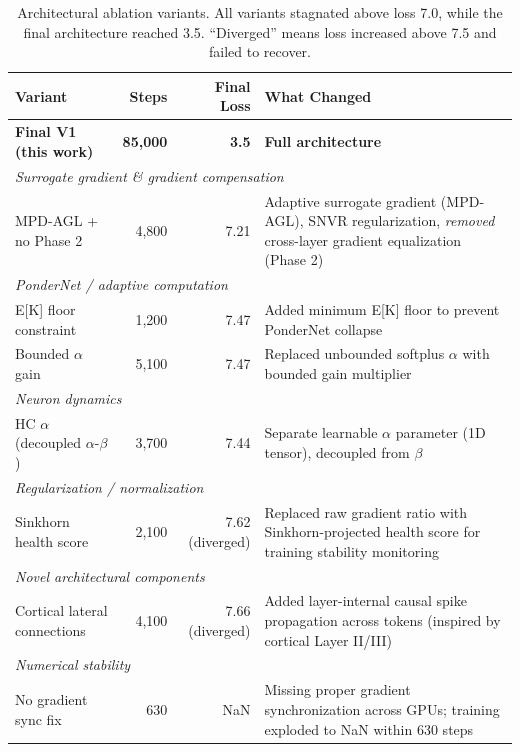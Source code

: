 \documentclass[10pt,twocolumn]{article}
\begin{document}
\begin{table}[H]
\centering
\caption{Architectural ablation variants. All variants stagnated above loss 7.0, while the final architecture reached 3.5.
``Diverged'' means loss increased above 7.5 and failed to recover.}
\label{tab:ablation}
\scriptsize
\begin{tabular}{p{1.8cm}rrp{3.5cm}}
\toprule
\textbf{Variant} & \textbf{Steps} & \textbf{Final Loss} & \textbf{What Changed} \\
\midrule
\textbf{Final V1 (this work)} & \textbf{85,000} & \textbf{3.5} & \textbf{Full architecture} \\
\midrule
\multicolumn{4}{l}{\emph{Surrogate gradient \& gradient compensation}} \\
\quad MPD-AGL + no Phase 2 & 4,800 & 7.21 & Adaptive surrogate gradient (MPD-AGL), SNVR regularization, \emph{removed} cross-layer gradient equalization (Phase 2) \\
\midrule
\multicolumn{4}{l}{\emph{PonderNet / adaptive computation}} \\
\quad E[K] floor constraint & 1,200 & 7.47 & Added minimum E[K] floor to prevent PonderNet collapse \\
\quad Bounded $\alpha$ gain & 5,100 & 7.47 & Replaced unbounded softplus $\alpha$ with bounded gain multiplier \\
\midrule
\multicolumn{4}{l}{\emph{Neuron dynamics}} \\
\quad HC $\alpha$ (decoupled $\alpha$-$\beta$) & 3,700 & 7.44 & Separate learnable $\alpha$ parameter (1D tensor), decoupled from $\beta$ \\
\midrule
\multicolumn{4}{l}{\emph{Regularization / normalization}} \\
\quad Sinkhorn health score & 2,100 & 7.62 (diverged) & Replaced raw gradient ratio with Sinkhorn-projected health score for training stability monitoring \\
\midrule
\multicolumn{4}{l}{\emph{Novel architectural components}} \\
\quad Cortical lateral connections & 4,100 & 7.66 (diverged) & Added layer-internal causal spike propagation across tokens (inspired by cortical Layer II/III) \\
\midrule
\multicolumn{4}{l}{\emph{Numerical stability}} \\
\quad No gradient sync fix & 630 & NaN & Missing proper gradient synchronization across GPUs; training exploded to NaN within 630 steps \\
\bottomrule
\end{tabular}
\end{table}
\end{document}
